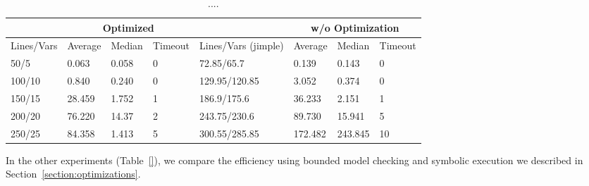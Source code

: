 \documentclass{llncs}
\begin{document}
\begin{table}
	\begin{tabular}{|l|l|l|l|l|l|l|l|}
\hline
		& \multicolumn{3}{c|}{\small Optimized}	& & \multicolumn{3}{c|}{\small w/o Optimization} \\
\hline
		\small Lines/Vars & \small Average & \small Median & \small Timeout & Lines/Vars (jimple)& \small Average & \small Median & \small Timeout \\
\hline
\hline
		50/5	&	0.063	&	0.058	&	0	&	72.85/65.7	&	0.139	&	0.143	&	0	\\
\hline
		100/10	&	0.840	&	0.240	&	0	&	129.95/120.85	&	3.052	&	0.374	&	0	\\
\hline
		150/15	&	28.459	&	1.752	&	1	&	186.9/175.6	&	36.233	&	2.151	&	1	\\
\hline
		200/20	&	76.220	&	14.37	&	2	&	243.75/230.6	&	89.730	&	15.941	&	5	\\
\hline
		250/25	&	84.358	&	1.413	&	5	&	300.55/285.85	&	172.482	&	243.845	&	10	\\
\hline
	\end{tabular}
	\caption{....}
	\label{tab:opt2}
\end{table}



In the other experiments (Table~\ref{}), we compare the efficiency using bounded model checking and symbolic execution we described in Section~\ref{section:optimizations}.



\end{document}
